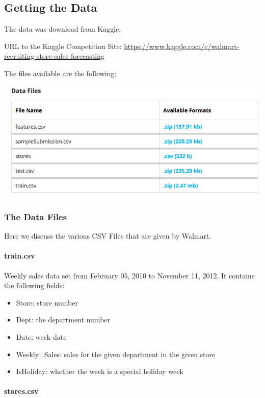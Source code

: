 \documentclass[]{article}
\begin{document}
\subsection{Getting the Data}\label{getting-the-data}

The data was download from Kaggle.

URL to the Kaggle Competition Site:
\url{https://www.kaggle.com/c/walmart-recruiting-store-sales-forecasting}

The files available are the following:

\includegraphics[scale=.5]{DataFilesImage}

\subsubsection{The Data Files}\label{the-data-files}

Here we discuss the various CSV Files that are given by Walmart.

\paragraph{train.csv}\label{train.csv}

Weekly sales data set from February 05, 2010 to November 11, 2012. It
contains the following fields:

\begin{itemize}
\itemsep1pt\parskip0pt
\item
  Store: store number
\item
  Dept: the department number
\item
  Date: week date
\item
  Weekly\_Sales: sales for the given department in the given store
\item
  IsHoliday: whether the week is a special holiday week
\end{itemize}

\paragraph{stores.csv}\label{stores.csv}
\end{document}
